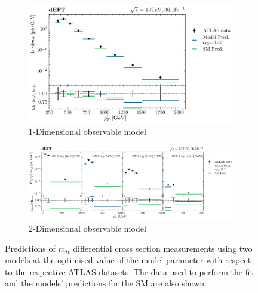 \documentclass[a4paper,11pt]{article}
\begin{document}
\begin{figure}[htb]
    \centering
    \begin{subfigure}[b]{0.8\textwidth}
        \centering
        \includegraphics[width=\textwidth]{plots/ATLAS_model_result_1D_1OP.png}
        \caption{1-Dimensional observable model}
    \end{subfigure}
    \par\bigskip
    \begin{subfigure}[b]{\textwidth}
        \centering
        \includegraphics[width=\textwidth]{plots/ATLAS_model_result_2D_1OP.png}
        \caption{2-Dimensional observable model}
    \end{subfigure}
    \caption{Predictions of $m_{t\bar{t}}$ differential cross section measurements using two models at the optimised value of the model parameter with respect to the respective ATLAS datasets. The data used to perform the fit and the models' predictions for the SM are also shown.}
    \label{fig:model_result_1OP}
\end{figure}
\end{document}

